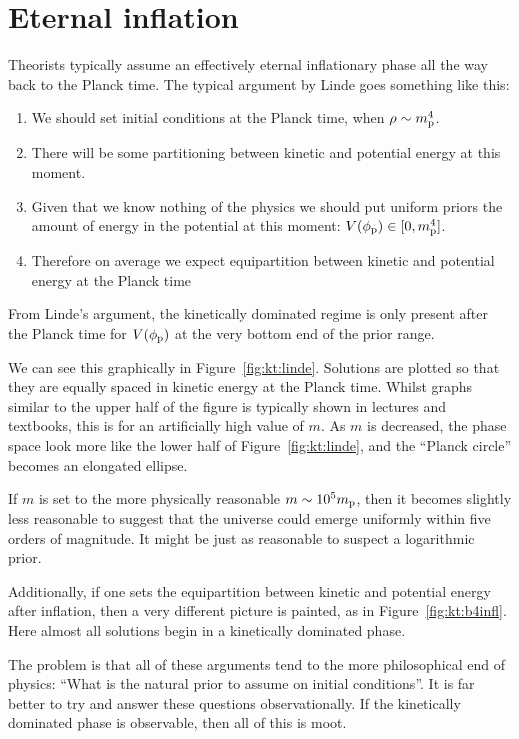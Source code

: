 \section{Eternal inflation}
Theorists typically assume an effectively eternal inflationary phase all the way back to the Planck time.  
The typical argument by Linde goes something like this:
\begin{enumerate}
  \item We should set initial conditions at the Planck time, when
    $\rho\sim m_{\mathrm{p}}^4$.
  \item There will be some partitioning between kinetic and potential
    energy at this moment.
  \item Given that we know nothing of the physics we should put
    uniform priors the amount of energy in the potential at this
    moment: $V(\phi_{\mathrm{p}})\in[0,m_{\mathrm{p}}^4]$.
  \item Therefore on average we expect equipartition between kinetic
    and potential energy at the Planck time
\end{enumerate}

From Linde's argument, the kinetically dominated regime is only present
after the Planck time for $V(\phi_{\mathrm{p}})$ at the very bottom end of the
prior range.

We can see this graphically in Figure~\ref{fig:kt:linde}. Solutions are plotted so that they are equally spaced in kinetic energy at the Planck time. Whilst graphs similar to the upper half of the figure is typically shown in lectures and textbooks, this is for an artificially high value of $m$. As $m$ is decreased, the phase space look more like the lower half of Figure~\ref{fig:kt:linde}, and the ``Planck circle'' becomes an elongated ellipse. 

If $m$ is set to the more physically reasonable $m\sim10^5m_{\mathrm{p}}$, then it becomes slightly less reasonable to suggest that the universe could emerge uniformly within five orders of magnitude. It might be just as reasonable to suspect a logarithmic prior.

Additionally, if one sets the equipartition between kinetic and potential energy after inflation, then a very different picture is painted, as in Figure~\ref{fig:kt:b4infl}. Here almost all solutions begin in a kinetically dominated phase. 

The problem is that all of these arguments tend to the more philosophical end of physics: ``What is the natural prior to assume on initial conditions''. It is far better to try and answer these questions observationally. If the kinetically dominated phase is observable, then all of this is moot.

